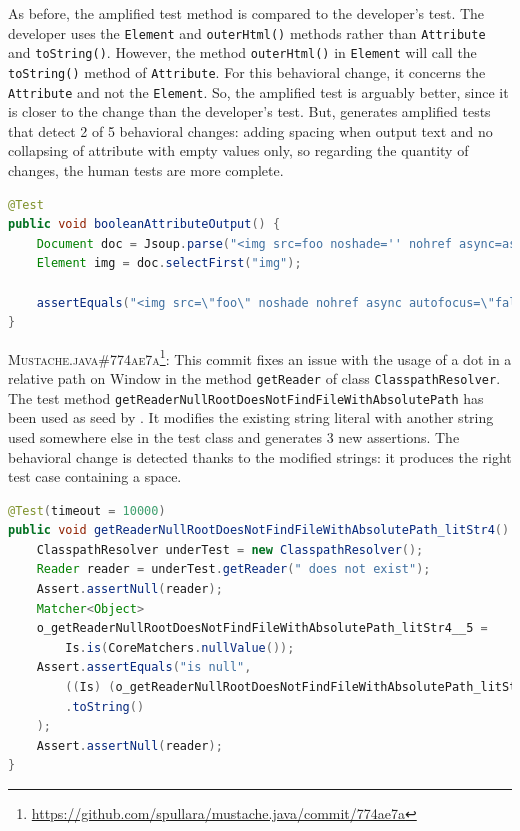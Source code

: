 As before, the amplified test method is compared to the developer's test. 
The developer uses the \texttt{Element} and \texttt{outerHtml()} methods rather than \texttt{Attribute} and \texttt{toString()}.
However, the method \texttt{outerHtml()} in \texttt{Element} will call the \texttt{toString()} method of \texttt{Attribute}.
For this behavioral change, it concerns the \texttt{Attribute} and not the \texttt{Element}.
So, the amplified test is arguably better, since it is closer to the change than the developer's test.
But, \DCII generates amplified tests that detect 2 of 5 behavioral changes: adding spacing when output text and no collapsing of attribute with empty values only, so regarding the quantity of changes, the human tests are more complete.

\begin{lstlisting}[language=java,caption=Provided test by the developer for \textsc{3676b13} of Jsoup.,label=fig:diff_jsoup]
@Test
public void booleanAttributeOutput() {
	Document doc = Jsoup.parse("<img src=foo noshade='' nohref async=async autofocus=false>");
	Element img = doc.selectFirst("img");

	assertEquals("<img src=\"foo\" noshade nohref async autofocus=\"false\">", img.outerHtml());
}
\end{lstlisting}

\textsc{Mustache.java\#774ae7a}\footnote{\url{https://github.com/spullara/mustache.java/commit/774ae7a}}: This commit fixes an issue with the usage of a dot in a relative path on Window in the method \texttt{getReader} of class \texttt{ClasspathResolver}.
The test method \texttt{getReaderNullRootDoesNotFindFileWithAbsolutePath} has been used as seed by \DCI.
It modifies the existing string literal with another string used somewhere else in the test class and generates 3 new assertions.
The behavioral change is detected thanks to the modified strings: it produces the right test case containing a space.

\begin{lstlisting}[language=java,caption=Test generated by \DCII that detects the behavioral change of \textsc{774ae7a} of Mustache.java.,label=fig:ampl_mustache]
@Test(timeout = 10000)
public void getReaderNullRootDoesNotFindFileWithAbsolutePath_litStr4() {
	ClasspathResolver underTest = new ClasspathResolver();
	Reader reader = underTest.getReader(" does not exist");
	Assert.assertNull(reader);
	Matcher<Object> 
	o_getReaderNullRootDoesNotFindFileWithAbsolutePath_litStr4__5 =
		Is.is(CoreMatchers.nullValue());
	Assert.assertEquals("is null", 
		((Is) (o_getReaderNullRootDoesNotFindFileWithAbsolutePath_litStr4__5))
		.toString()
	);
	Assert.assertNull(reader);
}
\end{lstlisting}


